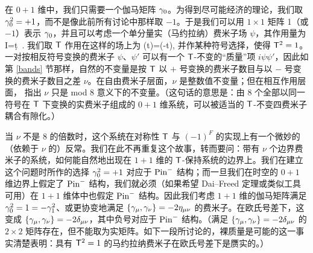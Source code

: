 在 $0+1$ 维中，我们只需要一个伽马矩阵 ${\gamma}_0$。为得到尽可能经济的理论，我们取 ${\gamma}_0^2=+1$，而不是像此前所有讨论中那样取 $-1$。于是我们可以用 $1\times 1$ 矩阵 1（或 $-1$）表示 ${\gamma}_0$，并且可以考虑一个单分量实（马约拉纳）费米子场 $\psi$，其作用量为
\be\label{dolb}I=\int \d t \,\psi{}\psi. \ee
我们取 ${\sf T}$ 作用在这样的场上为
\be\label{olb}\sT\psi(t)=\pm \psi(-t), \ee
并作某种符号选择，使得 ${\sf T}^2=1$。一对按相反符号变换的费米子 $\psi$、$\psi'$ 可以有一个 ${\sf T}$-不变的“质量”项 $i\psi\psi'$，因此如第 \ref{bands} 节那样，自然的不变量是按 ${\sf T}$ 以 $+$ 号变换的费米子数目与以 $-$ 号变换的费米子数目之差 $\nu$。在自由费米子层面，$\nu$ 是整数值不变量；但在相互作用层面，\cite{FK} 指出 $\nu$ 只是 mod 8 意义下的不变量。（这句话的意思是：由 8 个全部以同一符号在 ${\sf T}$ 下变换的实费米子组成的 $0+1$ 维系统，可以被适当的 ${\sf T}$-不变四费米子耦合有隙化。）


当 $\nu$ 不是 8 的倍数时，这个系统在对称性 ${\sf T}$ 与 $(-1)^F$ 的实现上有一个微妙的（依赖于 $\nu$ 的）反常。我们在此不再重复这个故事，转而要问：带有 $\nu$ 个边界费米子的系统，如何能自然地出现在 $1+1$ 维的 ${\sf T}$-保持系统的边界上。我们在建立这个问题时所作的选择 ${\gamma}_0^2=+1$ 对应于 ${\mathrm{Pin}}^-$ 结构；而一旦我们在时空的 $0+1$ 维边界上假定了 ${\mathrm{Pin}}^-$ 结构，我们就必须（如果希望 Dai--Freed 定理或类似工具可用）在 $1+1$ 维体中也假定 ${\mathrm{Pin}}^-$ 结构。因此我们考虑 $1+1$ 维的伽马矩阵满足 ${\gamma}_0^2=1=-{\gamma}_1^2$、或更协变地满足 $\{{\gamma}_\mu,{\gamma}_\nu\}=-2\eta_{\mu\nu}$ 的费米子。在欧氏号差下，这变成 $\{{\gamma}_\mu,{\gamma}_\nu\}=-2\delta_{\mu\nu}$，其中负号对应于 ${\mathrm{Pin}}^-$ 结构。（满足 $\{{\gamma}_\mu,{\gamma}_\nu\}=-2\delta_{\mu\nu}$ 的 $2\times 2$ 矩阵存在，但不能取为实矩阵。如下一段所讨论的，裸质量是可能的这一事实清楚表明：具有 ${\sf T}^2=1$ 的马约拉纳费米子在欧氏号差下是赝实的。）


